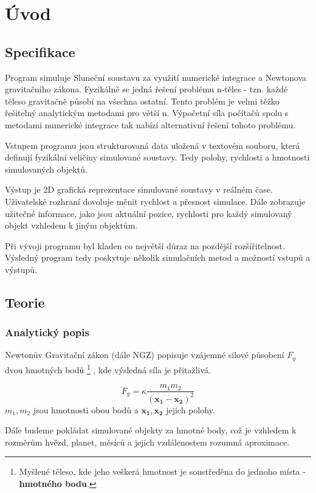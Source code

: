 
\chapter{Úvod}
\label{chap:uvod}

\section{Specifikace}
Program simuluje Sluneční soustavu za využití numerické integrace a Newtonova gravitačního zákona. Fyzikálně se jedná řešení problému n-těles - tzn. každé těleso gravitačně působí na všechna ostatní. Tento problém je velmi těžko řešitelný analytickým metodami pro větší n. Výpočetní síla počítačů spolu s metodami numerické integrace tak nabízí alternativní řešení tohoto problému.

Vstupem programu jsou strukturovaná data uložená v textovém souboru, která definují fyzikální veličiny simulované soustavy. Tedy polohy, rychlosti a hmotnosti simulovaných objektů. 

Výstup je 2D grafická reprezentace simulované soustavy v reálném čase. Uživatelské rozhraní dovoluje měnit rychlost a přesnost simulace. Dále zobrazuje užitečné informace, jako jsou aktuální pozice, rychlosti pro každý simulovaný objekt vzhledem k jiným objektům.

Při vývoji programu byl kladen co největší důraz na pozdější rozšířitelnost. Výsledný program tedy poskytuje několik simulačních metod a možností vstupů a výstupů. 

\section{Teorie}
\subsection{Analytický popis}
Newtonův Gravitační zákon (dále NGZ) popisuje vzájemné silové působení $ {F}_g $ dvou hmotných bodů
\footnote{Myšlené těleso, kde jeho veškerá hmotnost je soustředěna do jednoho místa - \textbf{hmotného bodu}. }
, kde výsledná síla je přitažlivá.

\begin{equation}
	{F}_g= \kappa \dfrac{m_1 m_2}{(\boldsymbol{x_1 - x_2})^2} 
\end{equation}
$ m_1,m_2 $ jsou hmotnosti obou bodů a $ \boldsymbol{x_1,x_2} $ jejich polohy.

Dále budeme pokládat simulované objekty za hmotné body, což je vzhledem k rozměrům hvězd, planet, měsíců a jejich vzdálenostem rozumná aproximace.

